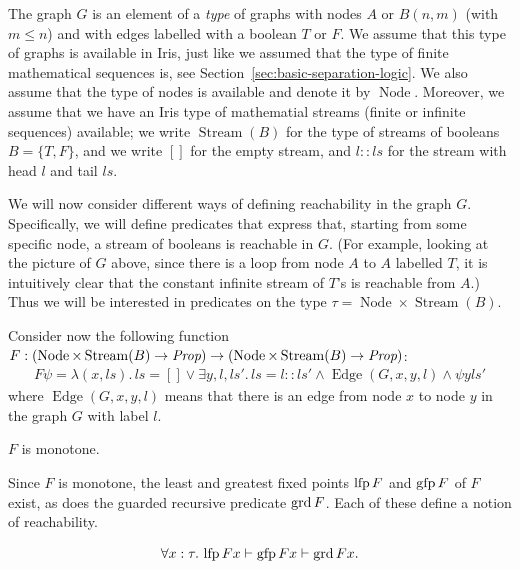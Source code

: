 \newcommand{\StrB}{\operatorname{Stream}(B)}
\newcommand{\NodeG}{\operatorname{Node}}

The graph $G$ is an element of a \emph{type} of graphs with nodes $A$ or $B(n,m)$ (with $m\leq n$) and with
edges labelled with a boolean $T$ or $F$. We assume that this type of graphs is available in Iris, just like we assumed that
the type of finite mathematical sequences is, see Section~\ref{sec:basic-separation-logic}. We also assume that
the type of nodes is available and denote it by $\NodeG$.
Moreover, we assume that we have an Iris type of mathematial streams (finite or infinite sequences) available; we write
$\operatorname{Stream}(B)$ for the type of streams of booleans $B=\{T,F\}$, and we write $[]$ for the empty stream,
and $l::ls$ for the stream with head $l$ and tail $ls$.

We will now consider different ways of defining reachability in the graph $G$.
Specifically, we will define predicates that express that, starting from some specific node,
a stream of booleans is reachable in $G$.
(For example, looking at the picture of $G$ above, since there is a loop from node $A$ to $A$
labelled $T$, it is intuitively clear that the constant infinite stream of $T$'s is reachable from $A$.)
Thus we will be interested in predicates on the type $\tau=\NodeG\times \StrB$.

Consider now the following function $F: (\NodeG\times \StrB\to\Prop) \to (\NodeG\times \StrB\to\Prop)$:
\begin{align*}
  F \psi = \lambda (x, ls).\,
    ls = [] \lor
    \exists y, l, ls'.\, ls = l::ls' \land \operatorname{Edge}(G,x,y,l) \land \psi y ls'
\end{align*}
where $\operatorname{Edge}(G,x,y,l)$ means that there is an edge from node $x$ to node $y$ in the graph $G$ with label $l$.

\begin{lemma}
  $F$ is monotone.
\end{lemma}

Since $F$ is monotone, the least and greatest fixed points $\operatorname{lfp} F$ and $\operatorname{gfp} F$ of $F$ exist,
as does the guarded recursive predicate $\operatorname{grd} F$. Each of these define a notion of reachability.


\begin{lemma}
  \label{lem:lfp-gfp-grd}
  \begin{align*}
    \forall x:\tau.\,
    \operatorname{lfp} F x \vdash \operatorname{gfp} F x \vdash \operatorname{grd} F x.
  \end{align*}
\end{lemma}

